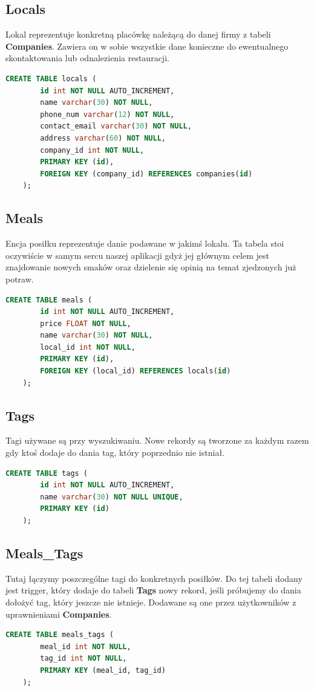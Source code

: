 \documentclass{report}
\begin{document}
\subsection*{Locals}
Lokal reprezentuje konkretną placówkę należącą do danej firmy
z tabeli \textbf{Companies}. Zawiera on w sobie wszystkie dane konieczne
do ewentualnego skontaktowania lub odnalezienia restauracji.
\begin{lstlisting}[language=SQL]
    CREATE TABLE locals (
        id int NOT NULL AUTO_INCREMENT,
        name varchar(30) NOT NULL,
        phone_num varchar(12) NOT NULL,
        contact_email varchar(30) NOT NULL,
        address varchar(60) NOT NULL,
        company_id int NOT NULL,
        PRIMARY KEY (id),
        FOREIGN KEY (company_id) REFERENCES companies(id)
    );
\end{lstlisting}

\subsection*{Meals}
Encja posiłku reprezentuje danie podawane w jakimś lokalu.
Ta tabela stoi oczywiście w samym sercu naszej aplikacji gdyż
jej głównym celem jest znajdowanie nowych smaków oraz dzielenie
się opinią na temat zjedzonych już potraw.
\begin{lstlisting}[language=SQL]
    CREATE TABLE meals (
        id int NOT NULL AUTO_INCREMENT,
        price FLOAT NOT NULL,
        name varchar(30) NOT NULL, 
        local_id int NOT NULL,
        PRIMARY KEY (id),
        FOREIGN KEY (local_id) REFERENCES locals(id)
    );
\end{lstlisting}

\subsection*{Tags}
Tagi używane są przy wyszukiwaniu. Nowe rekordy są tworzone
za każdym razem gdy ktoś dodaje do dania tag, który poprzednio
nie istniał.
\begin{lstlisting}[language=SQL]
    CREATE TABLE tags (
        id int NOT NULL AUTO_INCREMENT, 
        name varchar(30) NOT NULL UNIQUE,
        PRIMARY KEY (id)
    );
\end{lstlisting}

\subsection*{Meals\_Tags}
Tutaj łączymy poszczególne tagi do konkretnych posiłków.
Do tej tabeli dodany jest trigger, który dodaje do tabeli \textbf{Tags}
nowy rekord, jeśli próbujemy do dania dołożyć tag, który jeszcze nie istnieje.
Dodawane są one przez użytkowników z uprawnieniami \textbf{Companies}.
\begin{lstlisting}[language=SQL]
    CREATE TABLE meals_tags ( 
        meal_id int NOT NULL,
        tag_id int NOT NULL,
        PRIMARY KEY (meal_id, tag_id)
    );
\end{lstlisting}
\end{document}
